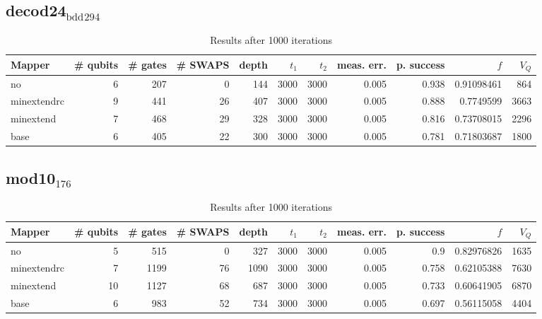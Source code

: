 \documentclass[11pt]{article}
\begin{document}
\subsection{decod24\(_{\text{bdd}}\)\(_{\text{294}}\)}
\label{sec:orgda110be}
\begin{table}[!htpb]
\caption{\label{tab:orgf99faa7}
Results after 1000 iterations}
\centering
\begin{tabular}{lrrrrrrrrrr}
\hline
Mapper & \# qubits & \# gates & \# SWAPS & depth & \(t_1\) & \(t_2\) & meas. err. & p. success & \(f\) & \(V_Q\)\\
\hline
no & 6 & 207 & 0 & 144 & 3000 & 3000 & 0.005 & 0.938 & 0.91098461 & 864\\
\hline
minextendrc & 9 & 441 & 26 & 407 & 3000 & 3000 & 0.005 & 0.888 & 0.7749599 & 3663\\
minextend & 7 & 468 & 29 & 328 & 3000 & 3000 & 0.005 & 0.816 & 0.73708015 & 2296\\
base & 6 & 405 & 22 & 300 & 3000 & 3000 & 0.005 & 0.781 & 0.71803687 & 1800\\
\hline
\end{tabular}
\end{table}
\subsection{mod10\(_{\text{176}}\)}
\label{sec:orgaf27b24}
\begin{table}[!htpb]
\caption{\label{tab:org4877b78}
Results after 1000 iterations}
\centering
\begin{tabular}{lrrrrrrrrrr}
\hline
Mapper & \# qubits & \# gates & \# SWAPS & depth & \(t_1\) & \(t_2\) & meas. err. & p. success & \(f\) & \(V_Q\)\\
\hline
no & 5 & 515 & 0 & 327 & 3000 & 3000 & 0.005 & 0.9 & 0.82976826 & 1635\\
\hline
minextendrc & 7 & 1199 & 76 & 1090 & 3000 & 3000 & 0.005 & 0.758 & 0.62105388 & 7630\\
minextend & 10 & 1127 & 68 & 687 & 3000 & 3000 & 0.005 & 0.733 & 0.60641905 & 6870\\
base & 6 & 983 & 52 & 734 & 3000 & 3000 & 0.005 & 0.697 & 0.56115058 & 4404\\
\hline
\end{tabular}
\end{table}
\end{document}
